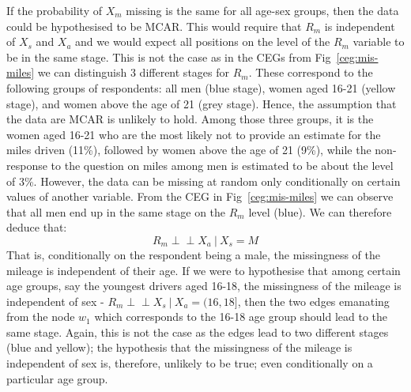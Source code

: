\documentclass[runningheads]{llncs}
\newcommand{\ind}{\perp\!\!\!\!\perp}
\begin{document}
If the probability of $X_m$ missing is the same for all age-sex groups, then the data could be hypothesised to be MCAR. This would require that $R_m$ is independent of $X_s$ and $X_a$ and we would expect all positions on the level of the $R_m$ variable to be in the same stage. 
This is not the case as in the CEGs from Fig~\ref{ceg:mis-miles} we can distinguish 3 different 
stages for $R_m$. These correspond to the following groups of respondents: 
all men (blue stage), women aged 16-21 (yellow stage), and women above the age of 21 (grey stage).
Hence, the assumption that the data are MCAR is unlikely to hold. Among those three groups, it is the women aged 16-21 who are the most likely not to provide an estimate for the miles driven (11\%), followed by women above the age of 21 (9\%), while the non-response to the question on miles among men is estimated to be about the level of 3\%. However, the data can be missing at random only conditionally on certain values of another variable. 
From the CEG in Fig~\ref{ceg:mis-miles} we can observe that all men end up in the same stage on the $R_m$ level (blue). We can therefore deduce that:
\[R_m \ind X_a \ | \ X_s = M\]
That is, conditionally on the respondent being a male, the missingness of the mileage is independent of their age. If we were to hypothesise that among certain age groups, say the youngest drivers aged 16-18, the missingness of the mileage is independent of sex - $R_m \ind  X_s \ | \ X_a = (16,18]$, then the two edges emanating from the node $w_1$ which corresponds to the 16-18 age group should lead to the same stage. Again, this is not the case as the edges lead to two different stages (blue and yellow); the hypothesis that the missingness of the mileage is independent of sex is, therefore, unlikely to be true; even conditionally on a particular age group.
\end{document}
